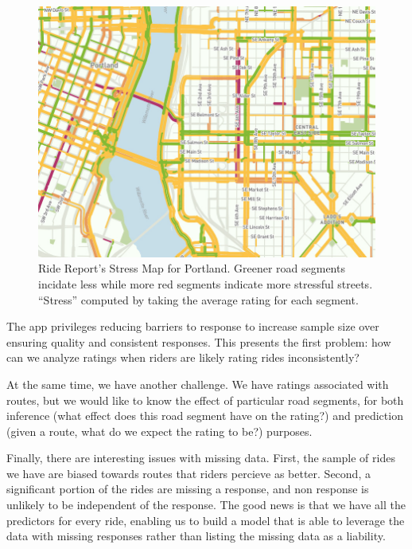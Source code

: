 \documentclass[12pt,twoside]{reedthesis}
\begin{document}
  \begin{figure}[h!tbp]
  \centering
  \includegraphics[scale = 1,angle = 0]{figure/stress_map.jpg}
  \caption[Ride Report's Stress Map for Portland. Greener road segments incidate less
  while more red segments indicate more stressful streets. ``Stress'' computed by
  taking the average rating for each segment.]{\normalsize{Ride Report's Stress Map for Portland. Greener road segments incidate less
  while more red segments indicate more stressful streets. ``Stress'' computed by
  taking the average rating for each segment.}}
  \label{fig:stress-map}
  \end{figure}
  
  The app privileges reducing barriers to response to increase sample size
  over ensuring quality and consistent responses. This presents the first
  problem: how can we analyze ratings when riders are likely rating rides
  inconsistently?
  
  At the same time, we have another challenge. We have ratings associated
  with routes, but we would like to know the effect of particular road
  segments, for both inference (what effect does this road segment have on
  the rating?) and prediction (given a route, what do we expect the rating
  to be?) purposes.
  
  Finally, there are interesting issues with missing data. First, the
  sample of rides we have are biased towards routes that riders percieve
  as better. Second, a significant portion of the rides are missing a
  response, and non response is unlikely to be independent of the
  response. The good news is that we have all the predictors for every
  ride, enabling us to build a model that is able to leverage the data
  with missing responses rather than listing the missing data as a
  liability.
  
\end{document}
